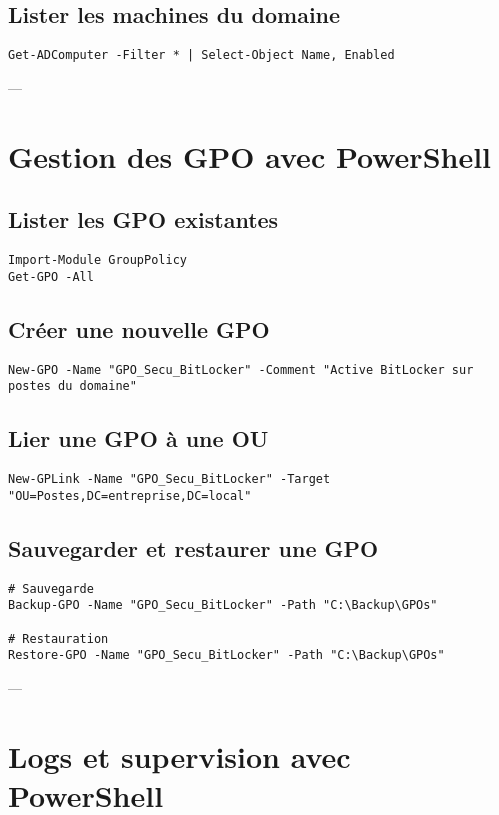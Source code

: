 \documentclass[a4paper,12pt]{article}
\begin{document}
\subsection{Lister les machines du domaine}
\begin{verbatim}
Get-ADComputer -Filter * | Select-Object Name, Enabled
\end{verbatim}

---

\section{Gestion des GPO avec PowerShell}
\subsection{Lister les GPO existantes}
\begin{verbatim}
Import-Module GroupPolicy
Get-GPO -All
\end{verbatim}

\subsection{Créer une nouvelle GPO}
\begin{verbatim}
New-GPO -Name "GPO_Secu_BitLocker" -Comment "Active BitLocker sur postes du domaine"
\end{verbatim}

\subsection{Lier une GPO à une OU}
\begin{verbatim}
New-GPLink -Name "GPO_Secu_BitLocker" -Target "OU=Postes,DC=entreprise,DC=local"
\end{verbatim}

\subsection{Sauvegarder et restaurer une GPO}
\begin{verbatim}
# Sauvegarde
Backup-GPO -Name "GPO_Secu_BitLocker" -Path "C:\Backup\GPOs"

# Restauration
Restore-GPO -Name "GPO_Secu_BitLocker" -Path "C:\Backup\GPOs"
\end{verbatim}

---

\section{Logs et supervision avec PowerShell}
\end{document}
